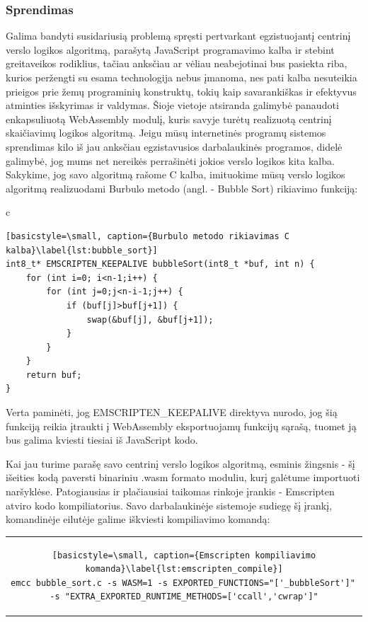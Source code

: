 \documentclass{VUMIFPSkursinis}
\begin{document}
\subsubsection{Sprendimas}
Galima bandyti susidariusią problemą spręsti pertvarkant egzistuojantį centrinį verslo logikos algoritmą, parašytą JavaScript programavimo kalba ir stebint greitaveikos rodiklius, tačiau anksčiau ar vėliau neabejotinai bus pasiekta riba, kurios peržengti su esama technologija nebus įmanoma, nes pati kalba nesuteikia prieigos prie žemų programinių konstruktų, tokių kaip savarankiškas ir efektyvus atminties išskyrimas ir valdymas. 
Šioje vietoje atsiranda galimybė panaudoti enkapsuliuotą WebAssembly modulį, kuris savyje turėtų realizuotą centrinį skaičiavimų logikos algoritmą. Jeigu mūsų internetinės programų sistemos sprendimas kilo iš jau anksčiau egzistavusios darbalaukinės programos, didelė galimybė, jog mums net nereikės perrašinėti jokios verslo logikos kita kalba. Sakykime, jog savo algoritmą rašome C kalba, imituokime mūsų verslo logikos algoritmą realizuodami Burbulo metodo (angl. - Bubble Sort) rikiavimo funkciją:

\begin{center}
\begin{tabular}{c}
\begin{lstlisting}[basicstyle=\small, caption={Burbulo metodo rikiavimas C kalba}\label{lst:bubble_sort}]
int8_t* EMSCRIPTEN_KEEPALIVE bubbleSort(int8_t *buf, int n) {
    for (int i=0; i<n-1;i++) {
        for (int j=0;j<n-i-1;j++) {
            if (buf[j]>buf[j+1]) {
                swap(&buf[j], &buf[j+1]);
            }
        }
    }
    return buf;
}
\end{lstlisting}
\end{tabular}
\end{center}

Verta paminėti, jog EMSCRIPTEN\_KEEPALIVE direktyva nurodo, jog šią funkciją reikia įtraukti į WebAssembly eksportuojamų funkcijų sąrašą, tuomet ją bus galima kviesti tiesiai iš JavaScript kodo. 

Kai jau turime parašę savo centrinį verslo logikos algoritmą, esminis žingsnis - šį išeities kodą paversti binariniu .wasm formato moduliu, kurį galėtume importuoti naršyklėse. Patogiausias ir plačiausiai taikomas rinkoje įrankis - Emscripten atviro kodo kompiliatorius. Savo darbalaukinėje sistemoje sudiegę šį įrankį, komandinėje eilutėje galime iškviesti kompiliavimo komandą:

\begin{center}
\begin{tabular}{c}
\begin{lstlisting}[basicstyle=\small, caption={Emscripten kompiliavimo komanda}\label{lst:emscripten_compile}]
emcc bubble_sort.c -s WASM=1 -s EXPORTED_FUNCTIONS="['_bubbleSort']" 
-s "EXTRA_EXPORTED_RUNTIME_METHODS=['ccall','cwrap']"
\end{lstlisting}
\end{tabular}
\end{center}
\end{document}
